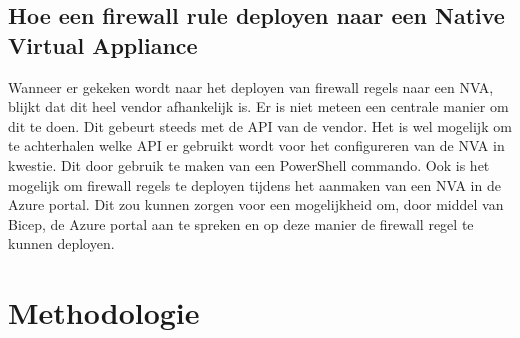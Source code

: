 \subsection*{Hoe een firewall rule deployen naar een Native Virtual Appliance}
Wanneer er gekeken wordt naar het deployen van firewall regels naar een NVA, blijkt dat dit heel vendor afhankelijk is. Er is niet meteen een centrale manier om dit te doen. Dit gebeurt steeds met de API van de vendor. Het is wel mogelijk om te achterhalen welke API er gebruikt wordt voor het configureren van de NVA in kwestie. Dit door gebruik te maken van een PowerShell commando. \autocite{Microsoft2022} Ook is het mogelijk om firewall regels te deployen tijdens het aanmaken van een NVA in de Azure portal. \autocite{Alto2022} Dit zou kunnen zorgen voor een mogelijkheid om, door middel van Bicep, de Azure portal aan te spreken en op deze manier de firewall regel te kunnen deployen. 


 



\section{Methodologie}%
\label{sec:methodologie}

